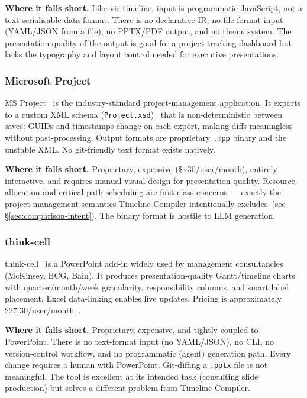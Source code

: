 \medskip\noindent
\textbf{Where it falls short.}
Like vis-timeline, input is programmatic JavaScript, not a text-serialisable
data format.  There is no declarative IR, no file-format input (YAML/JSON
from a file), no PPTX/PDF output, and no theme system.  The presentation
quality of the output is good for a project-tracking dashboard but lacks the
typography and layout control needed for executive presentations.

\subsubsection{Microsoft Project}

MS Project~\cite{msproject} is the industry-standard project-management
application.
It exports to a custom XML schema (\texttt{Project.xsd})~\cite{msprojectxml}
that is non-deterministic between saves: GUIDs and timestamps change on each
export, making diffs meaningless without post-processing.
Output formats are proprietary \texttt{.mpp} binary and the unstable XML.
No git-friendly text format exists natively.

\medskip\noindent
\textbf{Where it falls short.}
Proprietary, expensive (\$\textasciitilde{}30/user/month), entirely
interactive, and requires manual visual design for presentation quality.
Resource allocation and critical-path scheduling are first-class concerns ---
exactly the project-management semantics Timeline Compiler intentionally
excludes~(see \S\ref{sec:comparison-intent}).
The binary format is hostile to LLM generation.

\subsubsection{think-cell}

think-cell~\cite{thinkcell} is a PowerPoint add-in widely used by management
consultancies (McKinsey, BCG, Bain).
It produces presentation-quality Gantt/timeline charts~\cite{thinkcellgantt}
with quarter/month/week granularity, responsibility columns, and smart
label placement.
Excel data-linking enables live updates.
Pricing is approximately \$27.30/user/month~\cite{thinkcell}.

\medskip\noindent
\textbf{Where it falls short.}
Proprietary, expensive, and tightly coupled to PowerPoint.
There is no text-format input (no YAML/JSON), no CLI, no version-control
workflow, and no programmatic (agent) generation path.
Every change requires a human with PowerPoint.
Git-diffing a \texttt{.pptx} file is not meaningful.
The tool is excellent at its intended task (consulting slide production) but
solves a different problem from Timeline Compiler.

